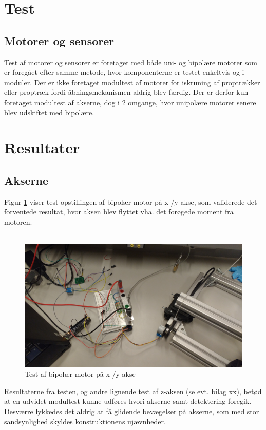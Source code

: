 \section{Test}
\subsection{Motorer og sensorer}
Test af motorer og sensorer er foretaget med både uni- og bipolære motorer som er foregået efter samme metode, hvor komponenterne er testet enkeltvis og i moduler. Der er ikke foretaget modultest af motorer for iskruning af proptrækker eller proptræk fordi åbningsmekanismen aldrig blev færdig. Der er derfor kun foretaget modultest af akserne, dog i 2 omgange, hvor unipolære motorer senere blev udskiftet med bipolære.

\section{Resultater}
\subsection{Akserne}


Figur \ref{Bipolar} viser test opstillingen af bipolær motor på x-/y-akse, som validerede det forventede resultat, hvor aksen blev flyttet vha. det forøgede moment fra motoren.\\\\
\begin{figure}[H]
	\caption{Test af bipolær motor på x-/y-akse}
	\label{Bipolar}
	\includegraphics[scale=0.09]{tex/TeImRe/Hardware/Bipolar_test_opstilling.jpg}
\end{figure}

Resultaterne fra testen, og andre lignende test af z-aksen (se evt. bilag xx), betød at en udvidet modultest kunne udføres hvori akserne samt detektering foregik. Desværre lykkedes det aldrig at få glidende bevægelser på akserne, som med stor sandsynlighed skyldes konstruktionens ujævnheder.\\

